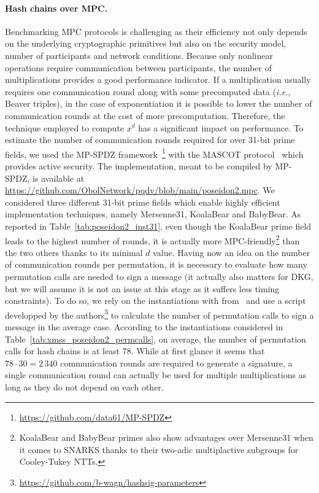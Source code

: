\paragraph{Hash chains over MPC.}
Benchmarking MPC protocols is challenging as their efficiency not only depends on the underlying cryptographic primitives but also on the security model, number of participants and network conditions.
Because only nonlinear operations require communication between participants, the number of multiplications provides a good performance indicator.
If a multiplication usually requires one communication round along with some precomputed data (\textit{i.e.}, Beaver triples), in the case of exponentiation it is possible to lower the number of communication rounds at the cost of more precomputation.
Therefore, the technique employed to compute $x^d$ has a significant impact on performance.
To estimate the number of communication rounds required for \PoseidonTwoPi over 31-bit prime fields, we used the MP-SPDZ framework~\cite{mp-spdz}\footnote{\url{https://github.com/data61/MP-SPDZ}} with the MASCOT protocol~\cite{mascot} which provides active security.
The \PoseidonTwoPi implementation, meant to be compiled by MP-SPDZ, is available at \url{https://github.com/ObolNetwork/pqdv/blob/main/poseidon2.mpc}.
We considered three different 31-bit prime fields which enable highly efficient implementation techniques, namely Mersenne31, KoalaBear and BabyBear.
As reported in Table~\ref{tab:poseidon2_inst31}, even though the KoalaBear prime field leads to the highest number of rounds, it is actually more MPC-friendly\footnote{KoalaBear and BabyBear primes also show advantages over Mersenne31 when it comes to SNARKS thanks to their two-adic multiplactive subgroups for Cooley-Tukey NTTs.} than the two others thanks to its minimal $d$ value.
Having now an idea on the number of communication rounds per permutation, it is necessary to evaluate how many permutation calls are needed to sign a message (it actually also matters for DKG, but we will assume it is not an issue at this stage as it suffers less timing constraints).
To do so, we rely on the \XMSS instantiations with \PoseidonTwo from~\cite{cryptoeprint:2025/055} and use a script developped by the authors\footnote{\url{https://github.com/b-wagn/hashsig-parameters}} to calculate the number of permutation calls to sign a message in the average case.
According to the instantiations considered in Table~\ref{tab:xmss_poseidon2_permcalls}, on average, the number of permutation calls for hash chains is at least 78.
While at first glance it seems that $78 \cdot 30 = 2\,340$ communication rounds are required to generate a signature, a single communication round can actually be used for multiple multiplications as long as they do not depend on each other.
